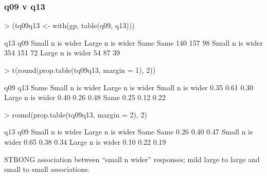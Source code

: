 \documentclass[11pt]{article}
\begin{document}
\subsubsection{q09 v q13}
\label{sec-1-3-1}
\begin{Schunk}
\begin{Sinput}
> (tq09q13 <- with(gp, table(q09, q13)))
\end{Sinput}
\begin{Soutput}
                  q13
q09                Small n is wider Large n is wider Same
  Same                          140              157   98
  Small n is wider              354              151   72
  Large n is wider               54               87   39
\end{Soutput}
\begin{Sinput}
> t(round(prop.table(tq09q13, margin = 1), 2))
\end{Sinput}
\begin{Soutput}
                  q09
q13                Same Small n is wider Large n is wider
  Small n is wider 0.35             0.61             0.30
  Large n is wider 0.40             0.26             0.48
  Same             0.25             0.12             0.22
\end{Soutput}
\begin{Sinput}
> round(prop.table(tq09q13, margin = 2), 2)
\end{Sinput}
\begin{Soutput}
                  q13
q09                Small n is wider Large n is wider Same
  Same                         0.26             0.40 0.47
  Small n is wider             0.65             0.38 0.34
  Large n is wider             0.10             0.22 0.19
\end{Soutput}
\end{Schunk}


STRONG association between ``small n wider'' responses; mild large to large and small to small associations.
\end{document}
